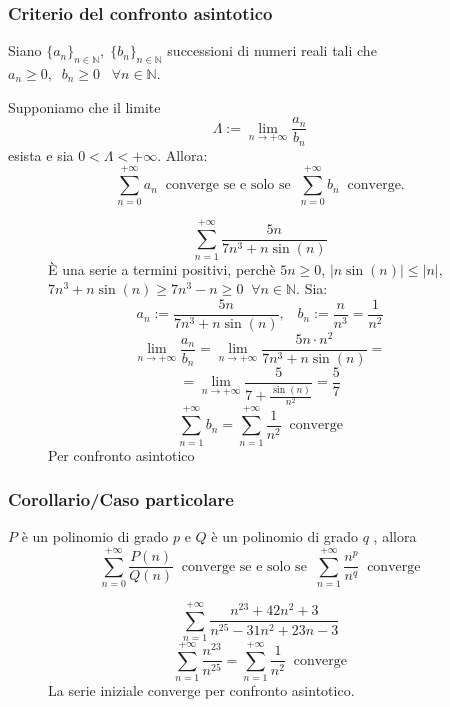 \documentclass[a4paper]{article}
\theoremstyle{break}
\theoremstyle{break}
\theoremstyle{break}
\theoremstyle{break}
\begin{document}
\subsubsection{Criterio del confronto asintotico}
Siano \( \{a_n\}_{n \in \mathbb{N}},\;\{b_n\}_{n \in \mathbb{N}}  \) successioni di numeri reali tali che
\( a_n \ge 0,\;\; b_n \ge 0 \;\;\; \forall n \in \mathbb{N} \).

Supponiamo che il limite
\[
  \Lambda := \lim_{n \to +\infty} \frac{a_n}{b_n}
\] 
esista e sia \( 0 < \Lambda < +\infty \). Allora:
\[
  \sum_{n=0}^{+\infty} a_n \;\; \text{converge se e solo se}\;\; \sum_{n=0}^{+\infty} b_n \;\; \text{converge.}
\] 
\begin{figure}[H]
  \begin{example}
    \[
      \sum_{n=1}^{+\infty} \frac{5n}{7n^3+n\sin(n)}
    \] 
    È una serie a termini positivi, perchè \( 5n \ge 0 \), \( |n\sin(n)| \le |n| \),
    \( 7n^3+n\sin(n) \ge 7n^3 - n \ge 0 \;\;\forall n \in \mathbb{N} \). Sia:
    \[
      a_n := \frac{5n}{7n^3+n\sin(n)},\;\;\; b_n := \frac{n}{n^3} = \frac{1}{n^2}
    \] 
    \[
      \lim_{n \to +\infty} \frac{a_n}{b_n} = \lim_{n \to +\infty} \frac{5n \cdot n^2}{7n^3+n\sin(n)} =
    \] 
    \[
      = \lim_{n \to +\infty} \frac{5}{7 + \frac{\sin(n)}{n^2}} = \frac{5}{7}
    \] 
    \[
      \sum_{n=1}^{+\infty} b_n = \sum_{n=1}^{+\infty} \frac{1}{n^2} \;\;\text{converge}
    \] 
    Per confronto asintotico
  \end{example}
\end{figure}
\subsubsection{Corollario/Caso particolare}
\( P \) è un polinomio di grado \( p \) e \( Q \) è un polinomio di grado \( q \) , allora
\[
  \sum_{n=0}^{+\infty} \frac{P(n)}{Q(n)} \;\;\text{converge se e solo se}\;\; \sum_{n=1}^{+\infty} \frac{n^p}{n^q}\;\; \text{converge}
\] 
\begin{figure}[H]
  \begin{example}
    \[
      \sum_{n=1}^{+\infty} \frac{n^{23} + 42 n^2 + 3}{n^{25} - 31n^2 + 23n - 3}
    \] 
    \[
      \sum_{n=1}^{+\infty} \frac{n^{23}}{n^{25}} = \sum_{n=1}^{+\infty} \frac{1}{n^2} \;\;\text{converge}
    \] 
    La serie iniziale converge per confronto asintotico.
  \end{example}
\end{figure}
\end{document}
